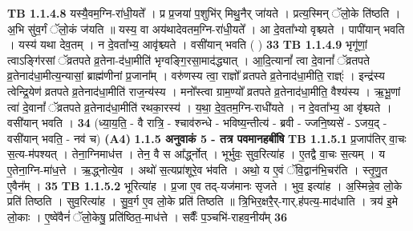 \documentclass[17pt]{extarticle}
\begin{document}
                  \newline
                                \textbf{ TB 1.1.4.8} \newline
                  यस्यै॒वम॒ग्नि-रा॑धी॒यते᳚ । प्र प्र॒जया॑ प॒शुभि॑र् मिथु॒नैर् जा॑यते । प्रत्य॒स्मिन् ॅलो॒के ति॑ष्ठति । अ॒भि सु॑व॒र्गं ॅलो॒कं ज॑यति ॥ यस्य॒ वा अय॑थादेवतम॒ग्नि-रा॑धी॒यते᳚ । आ दे॒वता᳚भ्यो वृश्च्यते । पापी॑यान् भवति । यस्य॑ यथा देव॒तम् । न दे॒वता᳚भ्य॒ आवृ॑श्च्यते । वसी॑यान् भवति ( ) \textbf{ 33} \newline
                  \newline
                                \textbf{ TB 1.1.4.9} \newline
                  भृगू॑णां॒ त्वाऽङ्गि॑रसां ॅव्रतपते व्र॒तेना-द॑धा॒मीति॑ भृग्वङ्गि॒रसा॒माद॑द्ध्यात् । आ॒दि॒त्यानां᳚ त्वा दे॒वानां᳚ ॅव्रतपते व्र॒तेनाद॑धा॒मीत्य॒न्यासां॒ ब्राह्म॑णीनां प्र॒जाना᳚म् । वरु॑णस्य त्वा॒ राज्ञो᳚ व्रतपते व्र॒तेनाद॑धा॒मीति॒ राज्ञ्ः॑ । इन्द्र॑स्य त्वेन्द्रि॒येण॑ व्रतपते व्र॒तेनाद॑धा॒मीति॑ राज॒न्य॑स्य । मनो᳚स्त्वा ग्राम॒ण्यो᳚ व्रतपते व्र॒तेनाद॑धा॒मीति॒ वैश्य॑स्य । ऋ॒भू॒णां त्वा॑ दे॒वानां᳚ ॅव्रतपते व्र॒तेनाद॑धा॒मीति॑ रथका॒रस्य॑ । य॒था॒ दे॒व॒तम॒ग्नि-राधी॑यते । न दे॒वता᳚भ्य॒ आ वृ॑श्च्यते । वसी॑यान् भवति । \textbf{ 34} \newline
                  \newline
                                    (ध्या॒य॒ति॒ - वै रात्रि॒ - श्चाव॑रुन्धे - भविष्य॒न्तीत्य॑ - ब्रवी - ज्जनि॒ष्यसे॑ - ऽजय॒द् - वसी॑यान् भवति॒ - नव॑ च) \textbf{(A4)} \newline \newline
                \textbf{ 1.1.5     अनुवाकं   5 - तत्र पवमानहबींषि} \newline
                                \textbf{ TB 1.1.5.1} \newline
                  प्र॒जाप॑तिर् वा॒चः स॒त्य-म॑पश्यत् । तेना॒ग्निमाध॑त्त । तेन॒ वै स आ᳚र्द्ध्नोत् । भूर्भुवः॒ सुव॒रित्या॑ह । ए॒तद्वै वा॒चः स॒त्यम् । य ए॒तेना॒ग्नि-मा॑ध॒त्ते । ऋ॒द्ध्नोत्ये॒व । अथो॑ स॒त्यप्रा॑शूरे॒व भ॑वति । अथो॒ य ए॒वं ॅवि॒द्वान॑भि॒चर॑ति । स्तृ॒णु॒त ए॒वैन᳚म् । \textbf{ 35} \newline
                  \newline
                                \textbf{ TB 1.1.5.2} \newline
                  भूरित्या॑ह । प्र॒जा ए॒व तद्-यज॑मानः सृजते । भुव॒ इत्या॑ह । अ॒स्मिन्ने॒व लो॒के प्रति॑ तिष्ठति । सुव॒रित्या॑ह । सु॒व॒र्ग ए॒व लो॒के प्रति॑ तिष्ठति ॥ त्रि॒भिर॒क्षरै॒र्-गार्.ह॑पत्य॒-माद॑धाति । त्रय॑ इ॒मे लो॒काः । ए॒ष्वे॑वैनं॑ ॅलो॒केषु॒ प्रति॑ष्ठित॒-माध॑त्ते । सर्वैः᳚ प॒ञ्चभि॑-राहव॒नीय᳚म् \textbf{ 36} \newline
\end{document}
